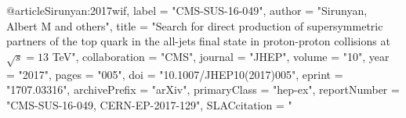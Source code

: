 @article{Sirunyan:2017wif,
      label          = "CMS-SUS-16-049",
      author         = "Sirunyan, Albert M and others",
      title          = "{Search for direct production of supersymmetric partners
                        of the top quark in the all-jets final state in
                        proton-proton collisions at $ \sqrt{s}=13 $ TeV}",
      collaboration  = "CMS",
      journal        = "JHEP",
      volume         = "10",
      year           = "2017",
      pages          = "005",
      doi            = "10.1007/JHEP10(2017)005",
      eprint         = "1707.03316",
      archivePrefix  = "arXiv",
      primaryClass   = "hep-ex",
      reportNumber   = "CMS-SUS-16-049, CERN-EP-2017-129",
      SLACcitation   = "%
}

